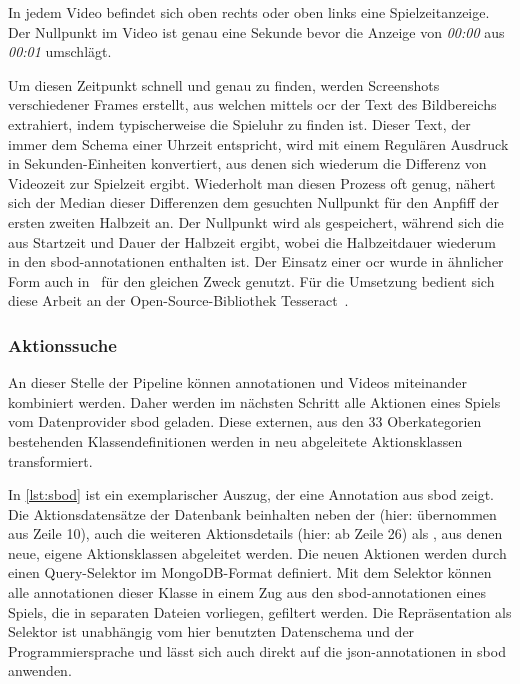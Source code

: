 In jedem Video befindet sich oben rechts oder oben links eine Spielzeitanzeige.
Der Nullpunkt im Video ist genau eine Sekunde bevor die Anzeige von \emph{00:00} aus \emph{00:01} umschlägt.

Um diesen Zeitpunkt schnell und genau zu finden, werden Screenshots verschiedener Frames erstellt, aus welchen mittels \gls{ocr} der Text des Bildbereichs extrahiert, indem typischerweise die Spieluhr zu finden ist.
Dieser Text, der immer dem Schema einer Uhrzeit entspricht, wird mit einem Regulären Ausdruck in Sekunden-Einheiten konvertiert, aus denen sich wiederum die Differenz von Videozeit zur Spielzeit ergibt.
Wiederholt man diesen Prozess oft genug, nähert sich der Median dieser Differenzen dem gesuchten Nullpunkt für den Anpfiff der ersten \bzw zweiten Halbzeit an.
Der Nullpunkt wird als  gespeichert, während sich die  aus Startzeit und Dauer der Halbzeit ergibt, wobei die Halbzeitdauer wiederum in den \gls{sbod}-\gls{annotationen} enthalten ist.
Der Einsatz einer \gls{ocr} wurde in ähnlicher Form auch in~\cite{Giancola18} für den gleichen Zweck genutzt.
Für die Umsetzung bedient sich diese Arbeit an der Open-Source-Bibliothek Tesseract~\cite{Smith07}.

\subsubsection{Aktionssuche}

An dieser Stelle der Pipeline können \gls{annotationen} und Videos miteinander kombiniert werden.
Daher werden im nächsten Schritt alle Aktionen eines Spiels vom Datenprovider \gls{sbod} geladen.
Diese externen, aus den 33 Oberkategorien bestehenden Klassendefinitionen \cite{StatsbombDocs16} werden in neu abgeleitete Aktionsklassen transformiert.

In \autoref{lst:sbod} ist ein exemplarischer Auszug, der eine Annotation aus \gls{sbod} zeigt.
Die Aktionsdatensätze der Datenbank beinhalten neben der  (hier: übernommen aus Zeile 10), auch die weiteren Aktionsdetails (hier: ab Zeile 26) als , aus denen neue, eigene Aktionsklassen abgeleitet werden.
Die neuen Aktionen werden durch einen Query-Selektor im MongoDB-Format\cite{Bradshaw16} definiert.
Mit dem Selektor können alle \gls{annotationen} dieser Klasse in einem Zug aus den \gls{sbod}-\gls{annotationen} eines Spiels, die in separaten Dateien vorliegen, gefiltert werden.
Die Repräsentation als Selektor ist unabhängig vom hier benutzten Datenschema und der Programmiersprache und lässt sich auch direkt auf die \gls{json}-\gls{annotationen} in \gls{sbod} anwenden.

